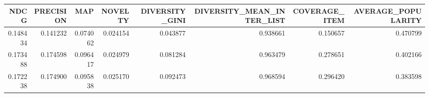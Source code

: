 \begin{tabular}{rrrrrrrr}
\toprule
    NDCG &  PRECISION &      MAP &  NOVELTY &  DIVERSITY\_GINI &  DIVERSITY\_MEAN\_INTER\_LIST &  COVERAGE\_ITEM &  AVERAGE\_POPULARITY \\
\midrule
0.148434 &   0.141232 & 0.074062 & 0.024154 &        0.043877 &                   0.938661 &       0.150657 &            0.470799 \\
0.173488 &   0.174598 & 0.096417 & 0.024979 &        0.081284 &                   0.963479 &       0.278651 &            0.402166 \\
0.172238 &   0.174900 & 0.095838 & 0.025170 &        0.092473 &                   0.968594 &       0.296420 &            0.383598 \\
\bottomrule
\end{tabular}

